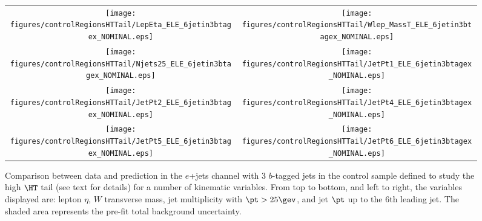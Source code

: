 \begin{figure}[htbp]
\begin{center}
\begin{tabular}{cc}
%
\texttt{[image: figures/controlRegionsHTTail/LepEta\_ELE\_6jetin3btagex\_NOMINAL.eps]} &
\texttt{[image: figures/controlRegionsHTTail/Wlep\_MassT\_ELE\_6jetin3btagex\_NOMINAL.eps]} \\
\texttt{[image: figures/controlRegionsHTTail/Njets25\_ELE\_6jetin3btagex\_NOMINAL.eps]} &
\texttt{[image: figures/controlRegionsHTTail/JetPt1\_ELE\_6jetin3btagex\_NOMINAL.eps]} \\
\texttt{[image: figures/controlRegionsHTTail/JetPt2\_ELE\_6jetin3btagex\_NOMINAL.eps]} &
\texttt{[image: figures/controlRegionsHTTail/JetPt4\_ELE\_6jetin3btagex\_NOMINAL.eps]} \\
\texttt{[image: figures/controlRegionsHTTail/JetPt5\_ELE\_6jetin3btagex\_NOMINAL.eps]} &
\texttt{[image: figures/controlRegionsHTTail/JetPt6\_ELE\_6jetin3btagex\_NOMINAL.eps]} \\
\end{tabular}\caption{\small {Comparison between data and prediction in the $e$+jets channel with 3 $b$-tagged jets in the control sample
defined to study the high $\HT$ tail (see text for details)  for a number of kinematic
variables. From top to bottom, and left to right, the variables displayed are: lepton $\eta$, $W$ transverse mass, jet multiplicity with $\pt>25\gev$, 
and jet $\pt$ up to the 6th leading jet.
The shaded area represents the pre-fit total background uncertainty.}}
\label{fig:ELE_controlHTTail_3btagex_2}
\end{center}
\end{figure}
